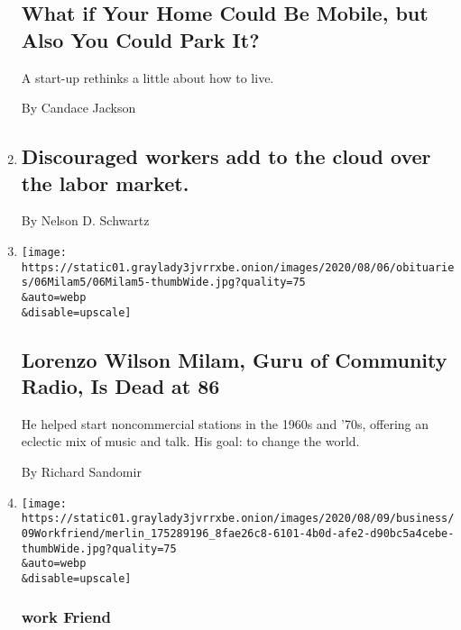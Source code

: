 \begin{enumerate}
{  \subsection{What if Your Home Could Be Mobile, but Also You Could Park
  It?}\label{what-if-your-home-could-be-mobile-but-also-you-could-park-it}}

  A start-up rethinks a little about how to live.

  By Candace Jackson
\item
  \href{/2020/08/07/business/discouraged-workers-add-to-the-cloud-over-the-labor-market.html}{}

  \hypertarget{discouraged-workers-add-to-the-cloud-over-the-labor-market}{%
  \subsection{Discouraged workers add to the cloud over the labor
  market.}\label{discouraged-workers-add-to-the-cloud-over-the-labor-market}}

  By Nelson D. Schwartz
\item
  \href{/2020/08/07/business/media/lorenzo-milam-dead.html}{}

  \texttt{[image: https://static01.graylady3jvrrxbe.onion/images/2020/08/06/obituaries/06Milam5/06Milam5-thumbWide.jpg?quality=75\\\&auto=webp\\\&disable=upscale]}

  \hypertarget{lorenzo-wilson-milam-guru-of-community-radio-is-dead-at-86}{%
  \subsection{Lorenzo Wilson Milam, Guru of Community Radio, Is Dead at
  86}\label{lorenzo-wilson-milam-guru-of-community-radio-is-dead-at-86}}

  He helped start noncommercial stations in the 1960s and '70s, offering
  an eclectic mix of music and talk. His goal: to change the world.

  By Richard Sandomir
\item
  \href{/2020/08/07/business/how-to-handle-a-friendly-co-worker-whos-really-a-total-jerk.html}{}

  \texttt{[image: https://static01.graylady3jvrrxbe.onion/images/2020/08/09/business/09Workfriend/merlin\_175289196\_8fae26c8-6101-4b0d-afe2-d90bc5a4cebe-thumbWide.jpg?quality=75\\\&auto=webp\\\&disable=upscale]}

  \hypertarget{work-friend}{%
  \subsubsection{work Friend}\label{work-friend}}


\end{enumerate}
